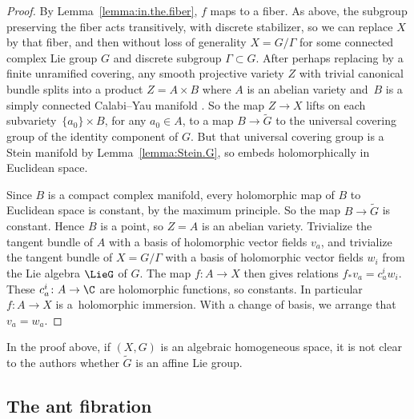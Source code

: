 \begin{proof}
By Lemma~\ref{lemma:in.the.fiber}, $f$ maps to a fiber.
As above, the subgroup preserving the fiber acts transitively, with discrete stabilizer, so we can replace $X$ by that fiber, and then without loss of generality $X=G/\Gamma$ for some connected complex Lie group $G$ and discrete subgroup ${\Gamma \subset G}$.
After perhaps replacing by a finite unramified covering, any smooth projective variety $Z$ with trivial canonical bundle splits into a product $Z=A \times B$ where $A$ is an abelian variety and~$B$ is a simply connected Calabi--Yau manifold \cite{Bogomolov:1974}.
So the map $Z\to X$ lifts on each subvariety~$\{a_0\} \times B$, for any $a_0 \in A$, to a map $B
\to \widetilde{G}$ to the universal covering group of the identity component of $G$.
But that universal covering group is a Stein manifold by Lemma~\ref{lemma:Stein.G}, so embeds holomorphically in Euclidean space.

Since $B$ is a compact complex manifold, every holomorphic map of $B$ to Euclidean space is constant, by the maximum principle.
So the map $B\to\widetilde{G}$ is constant.
Hence $B$ is a point, so $Z = A$ is an abelian variety.
Trivialize the tangent bundle of $A$ with a basis of holomorphic vector fields $v_a$, and trivialize the tangent bundle of $X
 = G/\Gamma$ with a basis of holomorphic vector fields $w_i$ from the Lie algebra $\LieG$ of $G$.
The map $f \colon A \to X$ then gives relations $f_* v_a = c^i_a w_i$.
These $c^i_a \colon A \to \C$ are holomorphic functions, so constants.
In particular $f \colon A \to X$ is a~holomorphic immersion.
With a change of basis, we arrange that $v_a = w_a$.
\end{proof}

In the proof above, if $(X,G)$ is an algebraic homogeneous space, it is not clear to the authors whether $\tilde{G}$ is an affine Lie group.

\subsection{The ant fibration}\label{subsec:ant}

